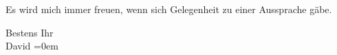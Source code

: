 \pstart
           Es wird mich immer freuen, wenn sich Gelegenheit zu einer Aussprache gäbe.\pend
           
\pstart
           Bestens Ihr{\\[\baselineskip]}\spacefill\mbox{David}\pend
           \leftskip=0em{}\endnumbering{}  \newcommand{\dateiname}{L00902}\newcommand{\titel}{Jakob Julius David an Arthur Schnitzler, [8. 3. 1899?]}\newcommand{\editorInnen}{Martin Anton Müller und Gerd-Hermann Susen}
